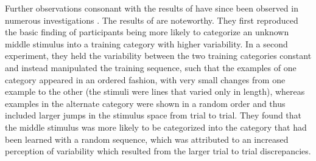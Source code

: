 \documentclass[
  12pt,
  letterpaper,
]{article}
\begin{document}
Further observations consonant with the results of
\textcite{cohenCategoryVariabilityExemplar2001} have since been observed
in numerous investigations
\autocites{hahnEffectsCategoryDiversity2005,perlmanFurtherAttemptsClarify2012,sakamotoPuttingPsychologyBack2008,hsuEffectsGenerativeDiscriminative2010}[but
see][ and
\textcite{yangCategoryVariabilityEffect2014}]{stewartEffectCategoryVariability2002}.
The results of \textcite{sakamotoPuttingPsychologyBack2008} are
noteworthy. They first reproduced the basic finding of participants
being more likely to categorize an unknown middle stimulus into a
training category with higher variability. In a second experiment, they
held the variability between the two training categories constant and
instead manipulated the training sequence, such that the examples of one
category appeared in an ordered fashion, with very small changes from
one example to the other (the stimuli were lines that varied only in
length), whereas examples in the alternate category were shown in a
random order and thus included larger jumps in the stimulus space from
trial to trial. They found that the middle stimulus was more likely to
be categorized into the category that had been learned with a random
sequence, which was attributed to an increased perception of variability
which resulted from the larger trial to trial discrepancies.
\end{document}
